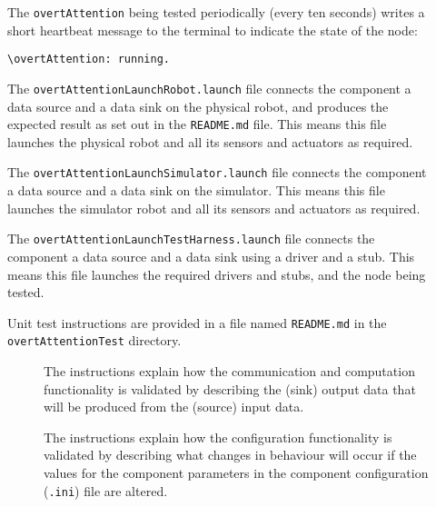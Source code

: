\documentclass{CSSRforAfrica}
\newcommand{\checkboxChecked}{\fbox{\ding{51}}} %
\newcommand{\checkboxDashed}{\fbox{--}}         %
\begin{document}
\begin{description}
\item[\checkboxChecked]  The {\small \verb+overtAttention+} being tested periodically (every ten seconds) writes a short heartbeat message to
 the terminal to indicate the state of the node:
\begin{verbatim}
\overtAttention: running.
\end{verbatim}

\item[\checkboxChecked] The {\small \verb+overtAttentionLaunchRobot.launch+} file  connects the component a data source and a data sink on the physical robot, and produces the expected result as set out in the  {\small \verb+README.md+}  file.    This means this file launches the physical robot and all its sensors and actuators as required.

\item[\checkboxDashed] The {\small \verb+overtAttentionLaunchSimulator.launch+} file  connects the component a data source and a data sink on the simulator.   This means this file launches the simulator robot and all its sensors and actuators as required.

\item[\checkboxChecked] The {\small \verb+overtAttentionLaunchTestHarness.launch+} file  connects the component a data source and a data sink using a driver and a stub.   This means this file launches the required drivers and stubs, and the node being tested.

\item[\checkboxChecked] Unit test instructions are provided in a file named {\small \verb+README.md+} in the  {\small \verb+overtAttentionTest+} directory. 


\begin{description}

\item[\checkboxChecked] The instructions explain how the communication and computation functionality is validated by describing the (sink) output data that will be produced from the (source) input data.  

\item[\checkboxChecked] The instructions explain how the configuration functionality is validated by describing what changes in behaviour will occur if the values for the component parameters in the component configuration ({\small \verb+.ini+}) file are altered.

\end{description}

\end{description} 
\end{document}
